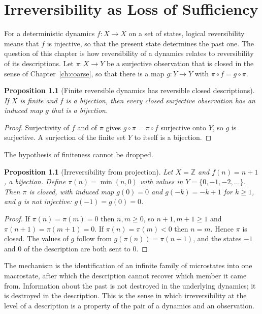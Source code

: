 \documentclass[11pt,oneside]{book}
\newtheorem{proposition}[theorem]{Proposition}
\theoremstyle{definition}
\theoremstyle{remark}
\begin{document}
\chapter{Irreversibility as Loss of Sufficiency}\label{ch:loss}

For a deterministic dynamics $f\colon X\to X$ on a set of states, logical reversibility means that $f$ is injective, so that the present state determines the past one. The question of this chapter is how reversibility of a dynamics relates to reversibility of its descriptions. Let $\pi\colon X\to Y$ be a surjective observation that is closed in the sense of Chapter~\ref{ch:coarse}, so that there is a map $g\colon Y\to Y$ with $\pi\circ f=g\circ\pi$.

\begin{proposition}[Finite reversible dynamics has reversible closed descriptions]\label{prop:finite-rev}
If $X$ is finite and $f$ is a bijection, then every closed surjective observation has an induced map $g$ that is a bijection.
\end{proposition}

\begin{proof}
Surjectivity of $f$ and of $\pi$ gives $g\circ\pi=\pi\circ f$ surjective onto $Y$, so $g$ is surjective. A surjection of the finite set $Y$ to itself is a bijection.
\end{proof}

The hypothesis of finiteness cannot be dropped.

\begin{proposition}[Irreversibility from projection]\label{prop:Zshift}
Let $X=\mathbb Z$ and $f(n)=n+1$, a bijection. Define $\pi(n)=\min(n,0)$ with values in $Y=\{0,-1,-2,\dots\}$. Then $\pi$ is closed, with induced map $g(0)=0$ and $g(-k)=-k+1$ for $k\geq1$, and $g$ is not injective: $g(-1)=g(0)=0$.
\end{proposition}

\begin{proof}
If $\pi(n)=\pi(m)=0$ then $n,m\geq0$, so $n+1,m+1\geq1$ and $\pi(n+1)=\pi(m+1)=0$. If $\pi(n)=\pi(m)<0$ then $n=m$. Hence $\pi$ is closed. The values of $g$ follow from $g(\pi(n))=\pi(n+1)$, and the states $-1$ and $0$ of the description are both sent to $0$.
\end{proof}

The mechanism is the identification of an infinite family of microstates into one macrostate, after which the description cannot recover which member it came from. Information about the past is not destroyed in the underlying dynamics; it is destroyed in the description. This is the sense in which irreversibility at the level of a description is a property of the pair of a dynamics and an observation.
\end{document}
